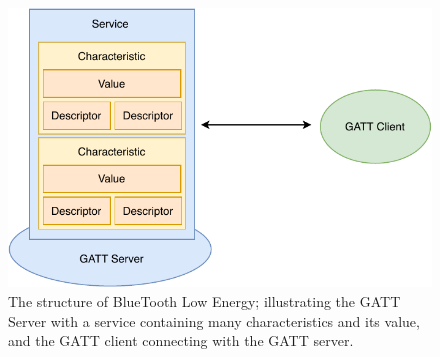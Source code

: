 \begin{figure}[h!]
    \centering
    \includegraphics[scale=0.85]{images/BLE2.pdf}
    \caption{The structure of BlueTooth Low Energy; illustrating the GATT Server with a service containing many characteristics and its value, and the GATT client connecting with the GATT server.}
    \label{fig:BLE}
\end{figure}

